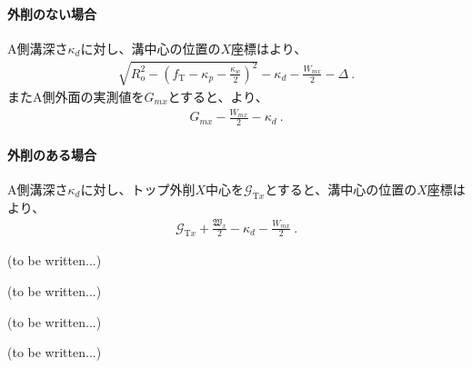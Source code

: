 \paragraph*{外削のない場合}\noindent
{}A側溝深さ$\kappa_d$に対し、溝中心の位置の$X$座標はより、
\begin{align*}
  \sqrt{R_\mathrm o^2-\left(f_\mathrm T-\kappa_p-\frac{\kappa_w}2\right)^{\!2}}-\kappa_d-\frac{W_{mx}}2
  -\varDelta\ .
\end{align*}
またA側外面の実測値を$G_{mx}$とすると、より、
\begin{align*}
  G_{mx}-\frac{W_{mx}}2-\kappa_d\ .
\end{align*}


\paragraph*{外削のある場合}\noindent
{}A側溝深さ$\kappa_d$に対し、トップ外削$X$中心を$\mathcal G_{\mathrm Tx}$とすると、溝中心の位置の$X$座標はより、
\begin{align*}
  \mathcal G_{\mathrm Tx}+\frac{\mathfrak W_x}2-\kappa_d-\frac{W_{mx}}2\ .
\end{align*}



\clearpage
(to be written...)


(to be written...)


(to be written...)





(to be written...)



